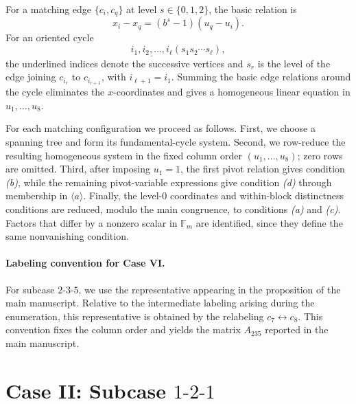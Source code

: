 \documentclass[11pt]{article}
\newcommand{\F}{\mathbb{F}}
\newcommand{\SpanA}{\langle a\rangle}
\begin{document}
For a matching edge $\{c_i,c_q\}$ at level $s\in\{0,1,2\}$, the basic relation is
\[
x_i-x_q=(b^s-1)(u_q-u_i).
\]
For an oriented cycle
\[
\underline{i_1,i_2,\ldots,i_\ell}(s_1s_2\cdots s_\ell),
\]
the underlined indices denote the successive vertices and $s_r$ is the level of the edge joining $c_{i_r}$ to $c_{i_{r+1}}$, with $i_{\ell+1}=i_1$.  Summing the basic edge relations around the cycle eliminates the $x$-coordinates and gives a homogeneous linear equation in $u_1,\ldots,u_8$.

For each matching configuration we proceed as follows.  First, we choose a spanning tree and form its fundamental-cycle system.  Second, we row-reduce the resulting homogeneous system in the fixed column order $(u_1,\ldots,u_8)$; zero rows are omitted.  Third, after imposing $u_1=1$, the first pivot relation gives condition \emph{(b)}, while the remaining pivot-variable expressions give condition \emph{(d)} through membership in $\SpanA$.  Finally, the level-$0$ coordinates and within-block distinctness conditions are reduced, modulo the main congruence, to conditions \emph{(a)} and \emph{(c)}.  Factors that differ by a nonzero scalar in $\F_m$ are identified, since they define the same nonvanishing condition.

\paragraph{Labeling convention for Case VI.}
For subcase $2\text{-}3\text{-}5$, we use the representative appearing in the proposition of the main manuscript.  Relative to the intermediate labeling arising during the enumeration, this representative is obtained by the relabeling $c_7\leftrightarrow c_8$.  This convention fixes the column order and yields the matrix $A_{235}$ reported in the main manuscript.

\section{Case II: Subcase $1\text{-}2\text{-}1$}
\end{document}
